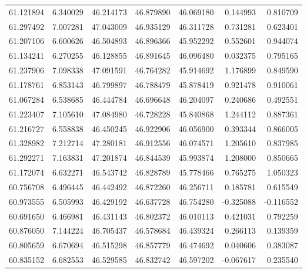 \begin{tabular}{rrrrrrr}
 61.121894 &   6.340029 &         46.214173 &         46.879890 &         46.069180 &  0.144993 &  0.810709 \\
 61.297492 &   7.007281 &         47.043009 &         46.935129 &         46.311728 &  0.731281 &  0.623401 \\
 61.207106 &   6.600626 &         46.504893 &         46.896366 &         45.952292 &  0.552601 &  0.944074 \\
 61.134241 &   6.270255 &         46.128855 &         46.891645 &         46.096480 &  0.032375 &  0.795165 \\
 61.237906 &   7.098338 &         47.091591 &         46.764282 &         45.914692 &  1.176899 &  0.849590 \\
 61.178761 &   6.853143 &         46.799897 &         46.788479 &         45.878419 &  0.921478 &  0.910061 \\
 61.067284 &   6.538685 &         46.444784 &         46.696648 &         46.204097 &  0.240686 &  0.492551 \\
 61.223407 &   7.105610 &         47.084980 &         46.728228 &         45.840868 &  1.244112 &  0.887361 \\
 61.216727 &   6.558838 &         46.450245 &         46.922906 &         46.056900 &  0.393344 &  0.866005 \\
 61.328982 &   7.212714 &         47.280181 &         46.912556 &         46.074571 &  1.205610 &  0.837985 \\
 61.292271 &   7.163831 &         47.201874 &         46.844539 &         45.993874 &  1.208000 &  0.850665 \\
 61.172074 &   6.632271 &         46.543742 &         46.828789 &         45.778466 &  0.765275 &  1.050323 \\
 60.756708 &   6.496445 &         46.442492 &         46.872260 &         46.256711 &  0.185781 &  0.615549 \\
 60.973555 &   6.505993 &         46.429192 &         46.637728 &         46.754280 & -0.325088 & -0.116552 \\
 60.691650 &   6.466981 &         46.431143 &         46.802372 &         46.010113 &  0.421031 &  0.792259 \\
 60.876050 &   7.144224 &         46.705437 &         46.578684 &         46.439324 &  0.266113 &  0.139359 \\
 60.805659 &   6.670694 &         46.515298 &         46.857779 &         46.474692 &  0.040606 &  0.383087 \\
 60.835152 &   6.682553 &         46.529585 &         46.832742 &         46.597202 & -0.067617 &  0.235540 \\

\end{tabular}

